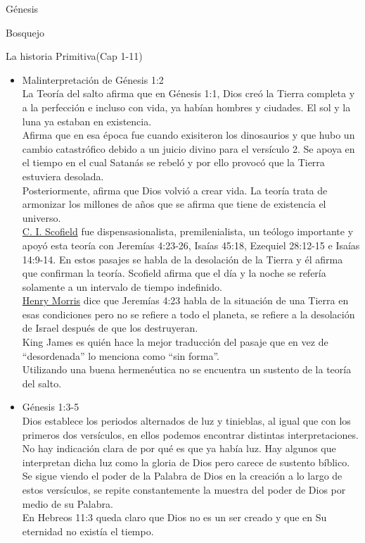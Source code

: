 \begin{section}{Génesis}
\begin{subsection}{Bosquejo}
\begin{subsubsection}{La historia Primitiva(Cap 1-11)}
\begin{enumerate}
\begin{itemize}
\item Malinterpretación de Génesis 1:2\\
La Teoría del salto afirma que en Génesis 1:1, Dios creó la Tierra completa y a la perfección e incluso con vida, ya habían hombres y ciudades. El sol y la luna ya estaban en existencia.\\
Afirma que en esa época fue cuando exisiteron los dinosaurios y que hubo un cambio catastrófico debido a un juicio divino para el versículo 2. Se apoya en el tiempo en el cual Satanás se rebeló y por ello provocó que la Tierra estuviera desolada.\\
					Posteriormente, afirma que Dios volvió a crear vida. La teoría trata de armonizar los millones 						de años que se afirma que tiene de existencia el universo.\\
					\underline{C. I. Scofield} fue dispensasionalista, premilenialista, un teólogo importante y apoyó esta teoría con Jeremías 4:23-26, Isaías 45:18, Ezequiel 28:12-15 e Isaías 14:9-14. En estos pasajes se habla de la desolación de la Tierra y él afirma que confirman la teoría. Scofield afirma que el día y la noche se refería solamente a un intervalo de tiempo indefinido.\\
					\underline{Henry Morris} dice que Jeremías 4:23 habla de la situación de una Tierra en esas condiciones pero no se refiere a todo el planeta, se refiere a la desolación de Israel después de que los destruyeran.\\
					King James es quién hace la mejor traducción del pasaje que en vez de ``desordenada'' lo menciona como ``sin forma''.\\
					Utilizando una buena hermenéutica no se encuentra un sustento de la teoría del salto.

				\item Génesis 1:3-5\\
				Dios establece los periodos alternados de luz y tinieblas, al igual que con los primeros dos versículos, en ellos podemos encontrar distintas interpretaciones. \\
				No hay indicación clara de por qué es que ya había luz. Hay algunos que interpretan dicha luz como la gloria de Dios pero carece de sustento bíblico. \\
					Se sigue viendo el poder de la Palabra de Dios en la creación a lo largo de estos versículos, se repite constantemente la muestra del poder de Dios por medio de su Palabra.\\
					En Hebreos 11:3 queda claro que Dios no es un ser creado y que en Su eternidad no existía el tiempo.\newpage


\end{itemize}
\end{enumerate}
\end{subsubsection}
\end{subsection}
\end{section}
